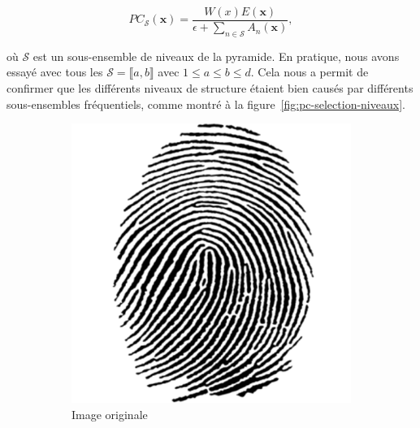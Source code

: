 \begin{equation}
    PC_{\mathcal{S}}(\mathbf{x}) = \frac{W(x)E(\mathbf{x})}{\epsilon + \sum_{n\in\mathcal{S}} A_{n}(\mathbf{x})},
\end{equation}

où $\mathcal{S}$ est un sous-ensemble de niveaux de la pyramide. En pratique, nous avons essayé avec tous les $\mathcal{S} = \llbracket a, b\rrbracket$ avec $1 \leq a \leq b \leq d$. Cela nous a permit de confirmer que les différents niveaux de structure étaient bien causés par différents sous-ensembles fréquentiels, comme montré à la figure~\ref{fig:pc-selection-niveaux}.

\begin{figure}
    \centering
    \begin{subfigure}[b]{.25\textwidth}
        \centering
        \includegraphics[width=\textwidth]{contenu/resources/images/fingerprint}
        \caption{Image originale}
    \end{subfigure}
    \hfill
    \begin{subfigure}[b]{.25\textwidth}
        \centering

\end{subfigure}
\end{figure}
